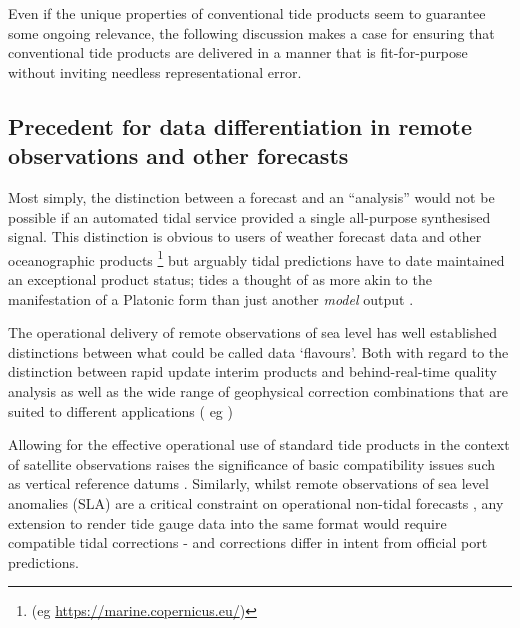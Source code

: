Even if the unique properties of conventional tide products seem to guarantee some ongoing relevance, the following discussion makes a case for ensuring that conventional tide products are delivered in a manner that is fit-for-purpose without inviting needless representational error. 


\subsection{Precedent for data differentiation in remote observations and other forecasts}

Most simply, the distinction between a forecast and an ``analysis'' would not be possible if an automated tidal service provided a single all-purpose synthesised signal.
This distinction is obvious to users of weather forecast data and other oceanographic products \footnote{(eg \url{https://marine.copernicus.eu/})} but arguably tidal predictions have to date maintained an exceptional product status; tides a thought of as more akin to the manifestation of a Platonic form than just another \textit{model} output \citep{Jay:2003bj} \citep{10.1029/2018rg000636}.


The operational delivery of remote  observations of sea level has well established distinctions between what could be called data `flavours'.   Both with regard to the distinction between rapid update interim products and behind-real-time quality analysis as well as the wide range of geophysical  correction combinations that are suited to different applications ( eg \citep{Scharroo:2014vv} )


Allowing for the effective operational use of standard tide products in the context of satellite observations raises the significance of basic compatibility 
issues such as vertical reference datums \citep{10.3389/fmars.2020.549467}.
Similarly, whilst remote observations of sea level anomalies (SLA) are a critical constraint on operational non-tidal forecasts \citep{10.1080/1755876x.2019.1685834}, any extension to render tide gauge data into the same format would require compatible tidal corrections - and corrections differ in intent from official port predictions.


